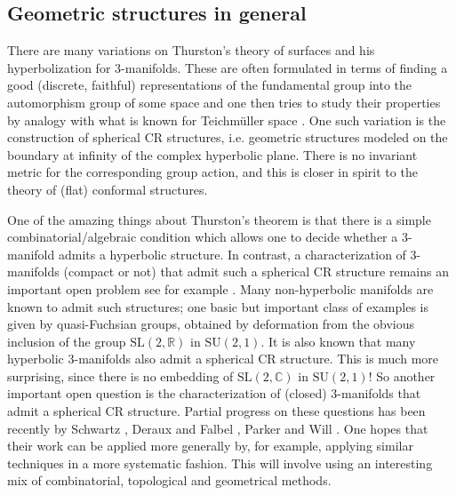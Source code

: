 \documentclass[14pt,fleqn]{article}
\begin{document}
\subsection{Geometric structures in general}

There are many variations
 on Thurston's theory of surfaces and his
 hyperbolization for 3-manifolds.
 These are often formulated in terms 
 of finding a good (discrete, faithful) 
 representations of the fundamental group
 into the automorphism group of some space
 and one then tries to study their properties by analogy with what is known 
 for Teichm\"uller space \cite{anne-19}.
 One such variation  is the construction of
spherical CR structures, 
i.e. geometric structures modeled on the
boundary at infinity of the complex hyperbolic plane. There is no
invariant metric for the corresponding group action, and this is
closer in spirit to the theory of (flat) conformal structures.

One of the amazing things about Thurston's theorem
is that there is a simple combinatorial/algebraic
condition which allows one to decide whether 
a 3-manifold admits a hyperbolic structure.
In contrast, a characterization of
3-manifolds (compact or not) that admit such a spherical CR structure remains an important open problem see for example \cite{derauxexpmath}.
Many non-hyperbolic manifolds are known to admit such
structures; 
one basic but important class of examples is given by
quasi-Fuchsian groups, obtained by deformation from the obvious inclusion of the group
$\mathrm{SL}(2,\mathbb{R})$ in $\mathrm{SU}(2,1)$.
It is also known that many hyperbolic 3-manifolds also admit a spherical CR structure.
This is much more surprising, since there is no
embedding of $\mathrm{SL}(2,\mathbb{C})$
 in $\mathrm{SU}(2,1)$! 
So another important open question is the characterization of (closed) 3-manifolds that admit a spherical CR structure.
Partial progress on these questions
 has been recently by Schwartz \cite{schwartz}, Deraux and Falbel \cite{derauxfalbel}, Parker and  Will \cite{parkerwill}.
One hopes that their work can be applied more generally by, for example, applying similar techniques in a more systematic fashion. 
This will involve using an interesting mix of
combinatorial, topological and geometrical methods.
\end{document}
